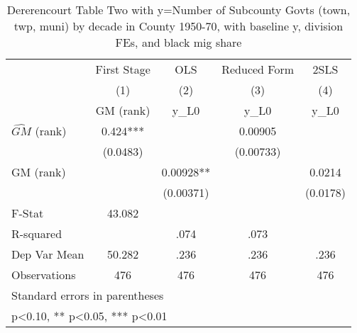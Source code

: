 \begin{table}[htbp]\centering
\def\sym#1{\ifmmode^{#1}\else\(^{#1}\)\fi}
\caption{Dererencourt Table Two with y=Number of Subcounty Govts (town, twp, muni) by decade in County 1950-70, with baseline y, division FEs, and black mig share}
\begin{tabular}{l*{4}{c}}
\toprule
                    & First Stage   &         OLS   &Reduced Form   &        2SLS   \\
                    &\multicolumn{1}{c}{(1)}&\multicolumn{1}{c}{(2)}&\multicolumn{1}{c}{(3)}&\multicolumn{1}{c}{(4)}\\
                    &\multicolumn{1}{c}{GM  (rank)}&\multicolumn{1}{c}{y\_L0}&\multicolumn{1}{c}{y\_L0}&\multicolumn{1}{c}{y\_L0}\\
\midrule
$\hat{GM}$ (rank)   &       0.424***&               &     0.00905   &               \\
                    &    (0.0483)   &               &   (0.00733)   &               \\
\addlinespace
GM  (rank)          &               &     0.00928** &               &      0.0214   \\
                    &               &   (0.00371)   &               &    (0.0178)   \\
\midrule
F-Stat              &      43.082   &               &               &               \\
R-squared           &               &        .074   &        .073   &               \\
Dep Var Mean        &      50.282   &        .236   &        .236   &        .236   \\
Observations        &         476   &         476   &         476   &         476   \\
\bottomrule
\multicolumn{5}{l}{\footnotesize Standard errors in parentheses}\\
\multicolumn{5}{l}{\footnotesize * p<0.10, ** p<0.05, *** p<0.01}\\
\end{tabular}
\end{table}
